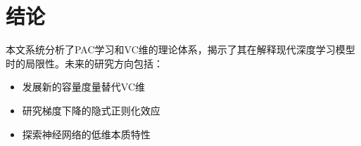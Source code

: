 \documentclass{article}
\begin{document}
\section{结论}
本文系统分析了PAC学习和VC维的理论体系，揭示了其在解释现代深度学习模型时的局限性。未来的研究方向包括：

\begin{itemize}
\item 发展新的容量度量替代VC维
\item 研究梯度下降的隐式正则化效应
\item 探索神经网络的低维本质特性
\end{itemize}
\end{document}
